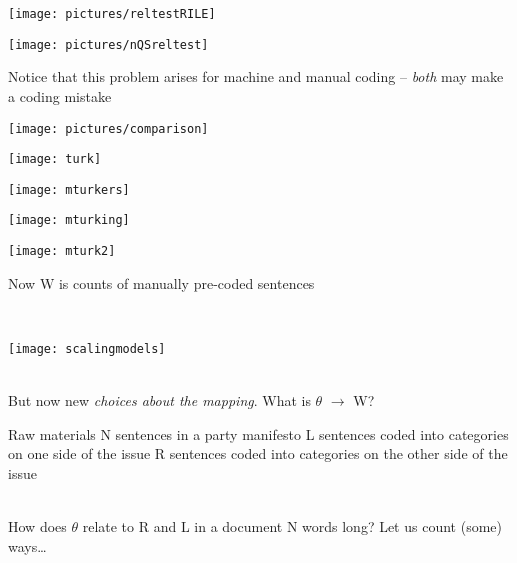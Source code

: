 \documentclass[kp]{foilpack}
\begin{document}

\begin{center}\texttt{[image: pictures/reltestRILE]}\end{center}


\begin{center}\texttt{[image: pictures/nQSreltest]}\end{center}


Notice that this problem arises for machine and manual coding -- \textit{both} may make a coding mistake

\begin{center}
\texttt{[image: pictures/comparison]}
\end{center}


\centerline{\texttt{[image: turk]}}


\centerline{\texttt{[image: mturkers]}}


\centerline{\texttt{[image: mturking]}}


\centerline{\texttt{[image: mturk2]}}


\slide{}


Now W is counts of manually pre-coded sentences

~\\
\centerline{\texttt{[image: scalingmodels]}} 


~\\
But now new \textit{choices about the mapping}.  What is $\theta$ $\longrightarrow$ W?



Raw materials
\ita
\itm N sentences in a party manifesto
\itm L sentences coded into categories on one side of the issue
\itm R sentences coded into categories on the other side of the issue
\itz

~\\
How does $\theta$ relate to R and L in a document N words long?
\ita
\itm Let us count (some) ways\ldots
\itz
\end{document}
